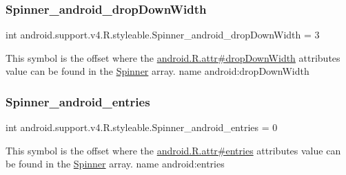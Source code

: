 \subsubsection{\texorpdfstring{Spinner\+\_\+android\+\_\+drop\+Down\+Width}{Spinner\_android\_dropDownWidth}}
{\footnotesize\ttfamily int android.\+support.\+v4.\+R.\+styleable.\+Spinner\+\_\+android\+\_\+drop\+Down\+Width = 3\hspace{0.3cm}{\ttfamily [static]}}

This symbol is the offset where the \hyperlink{}{android.\+R.\+attr\#drop\+Down\+Width} attribute\textquotesingle{}s value can be found in the \hyperlink{classandroid_1_1support_1_1v4_1_1R_1_1styleable_a34e1edd521133711195b551c5477c69d}{Spinner} array.  name android\+:drop\+Down\+Width \mbox{\label{classandroid_1_1support_1_1v4_1_1R_1_1styleable_a19ec0a416c4257798426ba10a934a6f7}} 
\subsubsection{\texorpdfstring{Spinner\+\_\+android\+\_\+entries}{Spinner\_android\_entries}}
{\footnotesize\ttfamily int android.\+support.\+v4.\+R.\+styleable.\+Spinner\+\_\+android\+\_\+entries = 0\hspace{0.3cm}{\ttfamily [static]}}

This symbol is the offset where the \hyperlink{}{android.\+R.\+attr\#entries} attribute\textquotesingle{}s value can be found in the \hyperlink{classandroid_1_1support_1_1v4_1_1R_1_1styleable_a34e1edd521133711195b551c5477c69d}{Spinner} array.  name android\+:entries \mbox{\label{classandroid_1_1support_1_1v4_1_1R_1_1styleable_ab961b75d708bd81e22cb4bb95449e536}} 
